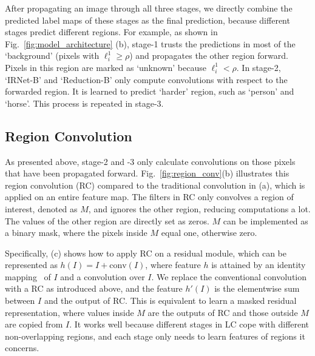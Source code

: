 \documentclass[10pt,twocolumn,letterpaper]{article}
\begin{document}
After propagating an image through all three stages, we directly combine the predicted label maps of these stages as the final prediction, because different stages predict different regions.
For example, as shown in Fig.~\ref{fig:model_architecture} (b), stage-1 trusts the predictions in most of the `background' (pixels with $\ell_i^1\geq\rho$) and propagates the other region forward.
Pixels in this region are marked as `unknown' because $\ell_i^1<\rho$.
In stage-2, `IRNet-B' and `Reduction-B' only compute convolutions with respect to the forwarded region.
It is learned to predict `harder' region, such as `person' and `horse'.
This process is repeated in stage-3.
































\subsection{Region Convolution}
\label{subsec:region_conv}


As presented above, stage-2 and -3 only calculate convolutions on those pixels that have been propagated forward.
Fig.~\ref{fig:region_conv}(b) illustrates this region convolution (RC) compared to the traditional convolution in (a), which is applied on an entire feature map.
The filters in RC only convolves a region of interest, denoted as $M$, and ignores the other region, reducing computations a lot. The values of the other region are directly set as zeros.
$M$ can be implemented as a binary mask,
where the pixels inside $M$ equal one, otherwise zero.


Specifically, (c) shows how to apply RC on a residual module, which can be represented as $h(I) = I+ \mathrm{conv}(I)$, where feature $h$ is attained by an identity mapping~\cite{He2015} of $I$ and a convolution over $I$.
We replace the conventional convolution with a RC as introduced above, and the feature $h'(I)$ is the elementwise sum between $I$ and the output of RC.
This is equivalent to learn a masked residual representation, where values inside $M$ are the outputs of RC and those outside $M$ are copied from $I$.
It works well because different stages in LC cope with different non-overlapping regions, and each stage only needs to learn features of regions it concerns.
\end{document}
